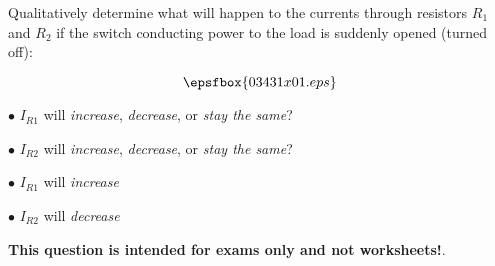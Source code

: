 

Qualitatively determine what will happen to the currents through resistors $R_1$ and $R_2$ if the switch conducting power to the load is suddenly opened (turned off):

$$\epsfbox{03431x01.eps}$$

\medskip
\item{$\bullet$} $I_{R1}$ will {\it increase}, {\it decrease}, or {\it stay the same}?
\item{$\bullet$} $I_{R2}$ will {\it increase}, {\it decrease}, or {\it stay the same}?
\medskip







\medskip
\item{$\bullet$} $I_{R1}$ will {\it increase}
\item{$\bullet$} $I_{R2}$ will {\it decrease}
\medskip







{\bf This question is intended for exams only and not worksheets!}.



